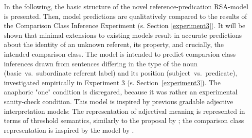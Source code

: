 In the following, the basic structure of the novel reference-predication RSA-model is presented. %
Then, model predictions are qualitatively compared to the results of the Comparison Class Inference Experiment (s. Section \ref{experiment3}). It will be shown that minimal extensions to existing models result in accurate predictions about the identity of an unknown referent, its property, and crucially, the intended comparison class. 
The model is intended to predict comparsion class inferences drawn from sentences differing in the type of the noun (basic~vs.~subordinate referent label) and its position (subject~vs.~predicate), investigated empirically in Experiment 3 (s. Section~\ref{experiment3}). The anaphoric "one" condition is disregared, because it was rather an experimental sanity-check condition. This model is inspired by previous gradable adjective interpretation models: The representation of adjectival meaning is represented in terms of threshold semantics, similarly to the proposal by \textcite{lassiter2013context}; the comparison class representation is inspired by the model by \textcite{tessler2017warm}.

